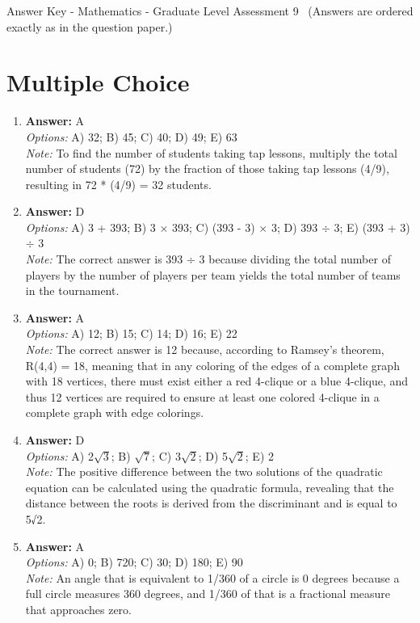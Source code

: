 \documentclass[12pt]{article}
\begin{document}
\begin{center}
Answer Key - Mathematics - Graduate Level Assessment 9 \
\small (Answers are ordered exactly as in the question paper.)
\end{center}

\section*{Multiple Choice}
\begin{enumerate}[label=\arabic*.]
\item \textbf{Answer:} A
\\ \textit{Options:} A) 32; B) 45; C) 40; D) 49; E) 63
\\ \textit{Note:} To find the number of students taking tap lessons, multiply the total number of students (72) by the fraction of those taking tap lessons (4/9), resulting in 72 * (4/9) = 32 students.
\item \textbf{Answer:} D
\\ \textit{Options:} A) 3 + 393; B) 3 \ensuremath{\times} 393; C) (393 - 3) \ensuremath{\times} 3; D) 393 \ensuremath{\div} 3; E) (393 + 3) \ensuremath{\div} 3
\\ \textit{Note:} The correct answer is 393 ÷ 3 because dividing the total number of players by the number of players per team yields the total number of teams in the tournament.
\item \textbf{Answer:} A
\\ \textit{Options:} A) 12; B) 15; C) 14; D) 16; E) 22
\\ \textit{Note:} The correct answer is 12 because, according to Ramsey's theorem, R(4,4) = 18, meaning that in any coloring of the edges of a complete graph with 18 vertices, there must exist either a red 4-clique or a blue 4-clique, and thus 12 vertices are required to ensure at least one colored 4-clique in a complete graph with edge colorings.
\item \textbf{Answer:} D
\\ \textit{Options:} A) 2\ensuremath{\sqrt{3}}; B) \ensuremath{\sqrt{7}}; C) 3\ensuremath{\sqrt{2}}; D) 5\ensuremath{\sqrt{2}}; E) 2
\\ \textit{Note:} The positive difference between the two solutions of the quadratic equation can be calculated using the quadratic formula, revealing that the distance between the roots is derived from the discriminant and is equal to 5√2.
\item \textbf{Answer:} A
\\ \textit{Options:} A) 0; B) 720; C) 30; D) 180; E) 90
\\ \textit{Note:} An angle that is equivalent to 1/360 of a circle is 0 degrees because a full circle measures 360 degrees, and 1/360 of that is a fractional measure that approaches zero.
\end{enumerate}
\end{document}
